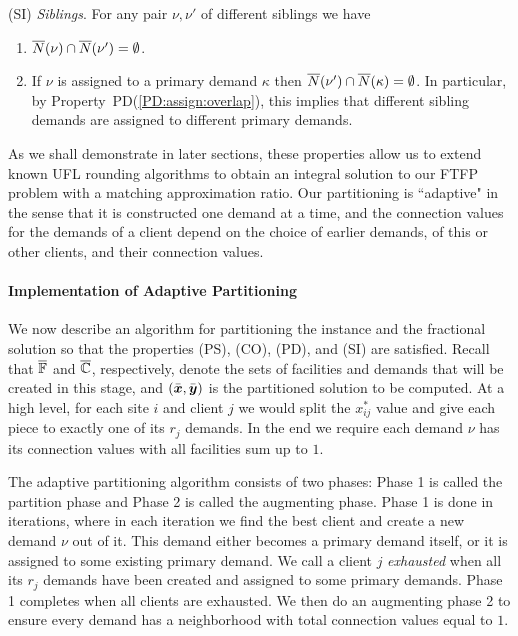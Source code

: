 \documentclass[11pt]{article}
\begin{document}
\begin{description}
\begin{enumerate}
\begin{enumerate}
			\end{enumerate}

	\end{enumerate}
	
\item{(SI)} \emph{Siblings}. For any pair $\nu,\nu'$ of different siblings we have
  \begin{enumerate}

	\item \label{SI:siblings disjoint}
		  ${\overline{N}}(\nu)\cap {\overline{N}}(\nu') = \emptyset$.
		
	\item \label{SI:primary disjoint} If $\nu$ is assigned to a primary demand $\kappa$ then
 		${\overline{N}}(\nu')\cap {\overline{N}}(\kappa) = \emptyset$. In particular, by Property~PD(\ref{PD:assign:overlap}),
		this implies that different sibling demands are assigned to different primary demands.

	\end{enumerate}
	
\end{description}

As we shall demonstrate in later sections, these properties
allow us to extend known UFL rounding algorithms to obtain
an integral solution to our FTFP problem with a matching
approximation ratio. Our partitioning is ``adaptive" in the
sense that it is constructed one demand at a time, and the
connection values for the demands of a client depend on the choice of
earlier demands, of this or other clients, and their connection values.


\paragraph{Implementation of Adaptive Partitioning}
We now describe an algorithm for partitioning the instance
and the fractional solution so that the properties (PS),
(CO), (PD), and (SI) are satisfied.  Recall that
$\overline{\mathbb{F}}$ and $\overline{\mathbb{C}}$, respectively, denote the
sets of facilities and demands that will be created in this
stage, and $(\bar{\boldsymbol{x}},\bar{\boldsymbol{y}})$ is the partitioned solution
to be computed. At a high level, for each site $i$ and
client $j$ we would split the $x_{ij}^\ast$ value and give
each piece to exactly one of its $r_j$ demands. In the end
we require each demand $\nu$ has its connection values with
all facilities sum up to $1$.

The adaptive partitioning algorithm consists of two phases:
Phase 1 is called the partition phase and Phase 2 is called
the augmenting phase. Phase 1 is done in iterations, where
in each iteration we find the best client and create a new
demand $\nu$ out of it. This demand either becomes a primary
demand itself, or it is assigned to some existing primary
demand. We call a client $j$ \emph{exhausted} when all its
$r_j$ demands have been created and assigned to some primary
demands. Phase 1 completes when all clients are
exhausted. We then do an augmenting phase 2 to ensure every
demand has a neighborhood with total connection values equal
to $1$.
\end{document}
